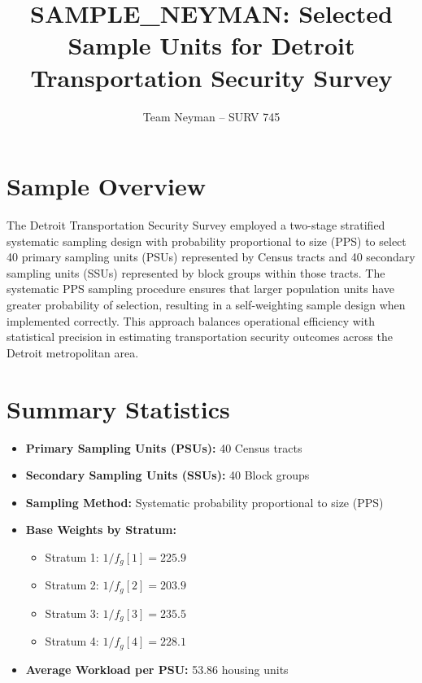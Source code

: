 \documentclass[11pt]{article}
\title{SAMPLE\_NEYMAN: Selected Sample Units for Detroit Transportation Security Survey}
\author{Team Neyman -- SURV 745}
\date{}
\begin{document}
\maketitle

\section*{Sample Overview}

The Detroit Transportation Security Survey employed a two-stage stratified systematic sampling design with probability proportional to size (PPS) to select 40 primary sampling units (PSUs) represented by Census tracts and 40 secondary sampling units (SSUs) represented by block groups within those tracts. The systematic PPS sampling procedure ensures that larger population units have greater probability of selection, resulting in a self-weighting sample design when implemented correctly. This approach balances operational efficiency with statistical precision in estimating transportation security outcomes across the Detroit metropolitan area.

\section*{Summary Statistics}

\begin{itemize}
\item \textbf{Primary Sampling Units (PSUs):} 40 Census tracts
\item \textbf{Secondary Sampling Units (SSUs):} 40 Block groups
\item \textbf{Sampling Method:} Systematic probability proportional to size (PPS)
\item \textbf{Base Weights by Stratum:}
  \begin{itemize}
    \item Stratum 1: $1/f_g[1] = 225.9$
    \item Stratum 2: $1/f_g[2] = 203.9$
    \item Stratum 3: $1/f_g[3] = 235.5$
    \item Stratum 4: $1/f_g[4] = 228.1$
  \end{itemize}
\item \textbf{Average Workload per PSU:} 53.86 housing units
\end{itemize}

\clearpage
\end{document}
